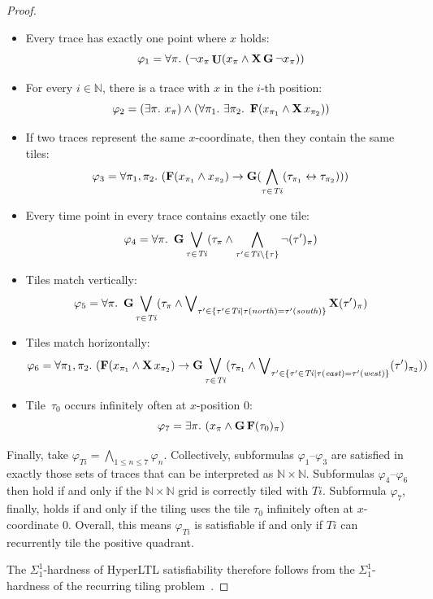 \documentclass[dvipsnames,10pt,a4paper]{amsart}
\theoremstyle{definition}
\theoremstyle{remark}
\renewcommand{\phi}{\varphi}
\newcommand{\F}{\mathop{\mathbf{F}\vphantom{a}}\nolimits}
\newcommand{\G}{\mathop{\mathbf{G}\vphantom{a}}\nolimits}
\DeclareMathOperator{\U}{\mathbf{U}}
\newcommand{\X}{\mathop{\mathbf{X}\vphantom{a}}\nolimits}
\newcommand{\hyltl}{{HyperLTL}\xspace}
\newcommand{\tileset}{\mathit{Ti}}
\renewcommand{\phi}{\varphi}
\newcommand{\east}{\mathit{east}}
\newcommand{\west}{\mathit{west}}
\newcommand{\north}{\mathit{north}}
\newcommand{\south}{\mathit{south}}
\begin{document}
\begin{proof}
\begin{itemize}
  \item Every trace has exactly one point where $x$ holds:
  \[\varphi_1 = \forall \pi.\ (\neg x_\pi \U (x_\pi\wedge \X\G\neg x_\pi))\]
  \item   For every $i\in\mathbb{N}$, there is a trace with $x$ in the $i$-th position:
  \[\phi_2 = (\exists \pi.\ x_\pi) \wedge (\forall \pi_1.\ \exists \pi_2.\ \F(x_{\pi_1}\wedge \X x_{\pi_2}))\]
  \item
  If two traces represent the same $x$-coordinate, then they contain the same tiles:
  \[\varphi_3 = \forall \pi_1,\pi_2.\ (\F(x_{\pi_1}\wedge x_{\pi_2})\rightarrow \G(\bigwedge_{\tau\in \tileset}(\tau_{\pi_1}\leftrightarrow \tau_{\pi_2})))\]
  \item Every time point in every trace contains exactly one tile:
  \[\varphi_4=\forall \pi.\ \G\bigvee_{\tau\in \tileset}(\tau_\pi\wedge \bigwedge_{\tau'\in \tileset\setminus \{\tau\}}\neg (\tau')_\pi)\]
  \item Tiles match vertically:
  \[\varphi_5=\forall \pi.\ \G\bigvee_{\tau\in \tileset}(\tau_\pi\wedge \bigvee\nolimits_{\tau'\in\{\tau'\in \tileset\mid \tau(\north)=\tau'(\south)\}}\X (\tau')_\pi)\]
  \item Tiles match horizontally:
  \[\varphi_6=\forall \pi_1,\pi_2.\ (\F(x_{\pi_1}\wedge \X x_{\pi_2})\rightarrow \G\bigvee_{\tau\in \tileset}(\tau_{\pi_1}\wedge \bigvee\nolimits_{\tau'\in \{\tau'\in \tileset\mid \tau(\east)=\tau'(\west)\}}(\tau')_{\pi_2}))\]
  \item Tile~$\tau_0$ occurs infinitely often at $x$-position $0$:
  \[\varphi_7=\exists \pi.\ (x_\pi \wedge \G\F (\tau_0)_\pi)\]
\end{itemize}

Finally, take $\varphi_{\tileset} = \bigwedge_{1\leq n \leq 7}\varphi_n$. Collectively, subformulas $\varphi_1$--$\varphi_3$ are satisfied in exactly those sets of traces that can be interpreted as $\mathbb{N}\times\mathbb{N}$. Subformulas $\varphi_4$--$\varphi_6$ then hold if and only if the $\mathbb{N}\times\mathbb{N}$ grid is correctly tiled with $\tileset$. Subformula $\varphi_7$, finally, holds if and only if the tiling uses the tile $\tau_0$ infinitely often at $x$-coordinate $0$. Overall, this means $\varphi_{\tileset}$ is satisfiable if and only if $\tileset$ can recurrently tile the positive quadrant.

The $\Sigma^1_1$-hardness of \hyltl satisfiability therefore follows from the $\Sigma_1^1$-hardness of the recurring tiling problem~\cite{Harel85}.
\end{proof}
\end{document}
